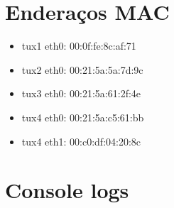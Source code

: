 \documentclass[11pt,a4paper,reqno]{report}
\numberwithin{equation}{section}
\begin{document}


\begin{appendices}

\chapter{Enderaços MAC}
\label{mac_addresses}
\begin{itemize} 
\item tux1 eth0: 00:0f:fe:8c:af:71
\item tux2 eth0: 00:21:5a:5a:7d:9c
\item tux3 eth0: 00:21:5a:61:2f:4e
\item tux4 eth0: 00:21:5a:c5:61:bb
\item tux4 eth1: 00:c0:df:04:20:8c
\end{itemize}

\chapter{Console logs}%


\end{appendices}
\end{document}
